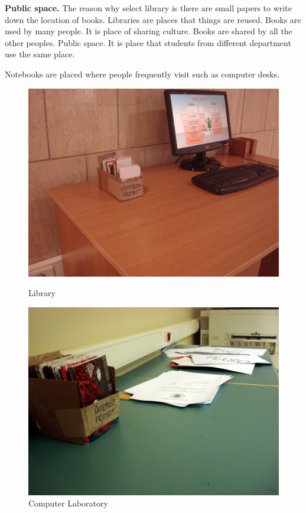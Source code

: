 \textbf{Public space.} The reason why select library is there are small papers to write down the location of books. Libraries are places that things are reused. Books are used by many people. It is place of sharing culture. Books are shared by all the other peoples. Public space. It is place that students from different department use the same place.

Notebooks are placed where people frequently visit such as computer desks.

\begin{figure}[!tbp]
  \centering
  \begin{minipage}[b]{0.48\textwidth}
    \includegraphics[width=\textwidth]{project_graphics/bilkent1.jpg}
    \caption{Library}
    \label{fig:BilkentLibrary}
  \end{minipage}
  \hfill
  \begin{minipage}[b]{0.48\textwidth}
    \includegraphics[width=\textwidth]{project_graphics/bilkent2.jpg}
    \caption{Computer Laboratory}
    \label{fig:BilkentLaboratory}
  \end{minipage}
\end{figure}

